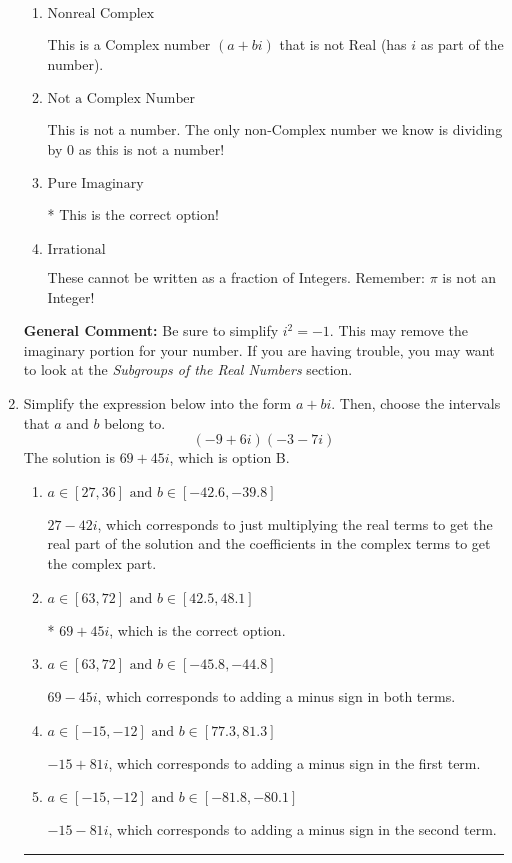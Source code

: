 \documentclass{extbook}[14pt]
\newcommand{\litem}[1]{\item #1

\rule{\textwidth}{0.4pt}}
\begin{document}
\begin{enumerate}
{\begin{enumerate}[label=\Alph*.]
These are numbers that can be written as fraction of Integers (e.g., -2/3 + 5)
\item \( \text{Nonreal Complex} \)

This is a Complex number $(a+bi)$ that is not Real (has $i$ as part of the number).
\item \( \text{Not a Complex Number} \)

This is not a number. The only non-Complex number we know is dividing by 0 as this is not a number!
\item \( \text{Pure Imaginary} \)

* This is the correct option!
\item \( \text{Irrational} \)

These cannot be written as a fraction of Integers. Remember: $\pi$ is not an Integer!
\end{enumerate}

\textbf{General Comment:} Be sure to simplify $i^2 = -1$. This may remove the imaginary portion for your number. If you are having trouble, you may want to look at the \textit{Subgroups of the Real Numbers} section.
}
\litem{
Simplify the expression below into the form $a+bi$. Then, choose the intervals that $a$ and $b$ belong to.
\[ (-9 + 6 i)(-3 - 7 i) \]The solution is \( 69 + 45 i \), which is option B.\begin{enumerate}[label=\Alph*.]
\item \( a \in [27, 36] \text{ and } b \in [-42.6, -39.8] \)

 $27 - 42 i$, which corresponds to just multiplying the real terms to get the real part of the solution and the coefficients in the complex terms to get the complex part.
\item \( a \in [63, 72] \text{ and } b \in [42.5, 48.1] \)

* $69 + 45 i$, which is the correct option.
\item \( a \in [63, 72] \text{ and } b \in [-45.8, -44.8] \)

 $69 - 45 i$, which corresponds to adding a minus sign in both terms.
\item \( a \in [-15, -12] \text{ and } b \in [77.3, 81.3] \)

 $-15 + 81 i$, which corresponds to adding a minus sign in the first term.
\item \( a \in [-15, -12] \text{ and } b \in [-81.8, -80.1] \)

 $-15 - 81 i$, which corresponds to adding a minus sign in the second term.
\end{enumerate}

}
\end{enumerate}
\end{document}
